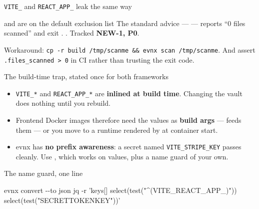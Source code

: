 \documentclass[aspectratio=169,10pt]{beamer}
\begin{document}
\begin{frame}[fragile]{\texttt{VITE\_} and \texttt{REACT\_APP\_} leak the same way}

  \vspace{0.4em}
  \begin{trap}{ and  are on the default exclusion list}
    The standard advice ---  --- reports
    ``0 files scanned'' and exit \exitzero. .
    Tracked \textbf{NEW-1, P0}.
  \end{trap}

  \vspace{0.4em}
  {\footnotesize Workaround: \texttt{cp -r build /tmp/scanme \&\& evnx scan
  /tmp/scanme}. And assert \texttt{.files\_scanned > 0} in CI rather than
  trusting the exit code.}
\end{frame}

\begin{frame}{The build-time trap, stated once for both frameworks}
  \small
  \begin{itemize}
    \item \texttt{VITE\_*} and \texttt{REACT\_APP\_*} are \textbf{inlined at
          build time}. Changing the vault does nothing until you rebuild.
    \item Frontend Docker images therefore need the values as \textbf{build
          args} ---  feeds them --- or you move to a
          runtime  rendered by  at container
          start.
    \item evnx has \textbf{no prefix awareness}: a secret named
          \texttt{VITE\_STRIPE\_KEY} passes  cleanly. Use
          , which works on values, plus a name guard of your own.
  \end{itemize}

  \vspace{0.7em}
  \begin{block}{The name guard, one line}
    \begin{center}\ttfamily\scriptsize
    evnx convert -{}-to json \textbar{} jq -r 'keys[] \textbar{} select(test("\^{}(VITE\_\textbar{}REACT\_APP\_)")) \textbar{} select(test("SECRET\textbar{}TOKEN\textbar{}KEY"))'
    \end{center}
  \end{block}
\end{frame}
\end{document}
